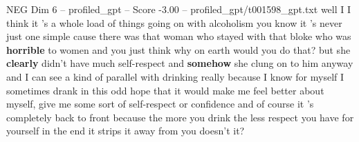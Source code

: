 \begin{textsample}{NEG Dim 6 – profiled\_gpt – Score -3.00 – profiled\_gpt/t001598\_gpt.txt}  \label{ex:f6_neg_007}
well I I think it 's a whole load of things going on with alcoholism you know it ’s never just one simple cause there was that woman who stayed with that bloke who was \textbf{horrible} to women and you just think why on earth would you do that? but she \textbf{clearly} didn't have much self-respect and \textbf{somehow} she clung on to him anyway and I can see a kind of parallel with drinking really because I know for myself I sometimes drank in this odd hope that it would make me feel better about myself, give me some sort of self-respect or confidence and of course it ’s completely back to front because the more you drink the less respect you have for yourself in the end it strips it away from you doesn't it?

\end{textsample}
